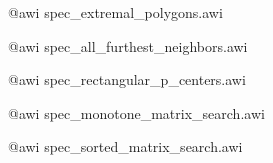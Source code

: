 
\ccParDims
\cgalColumnLayout

@awi spec_extremal_polygons.awi

@awi spec_all_furthest_neighbors.awi

@awi spec_rectangular_p_centers.awi

@awi spec_monotone_matrix_search.awi

@awi spec_sorted_matrix_search.awi

